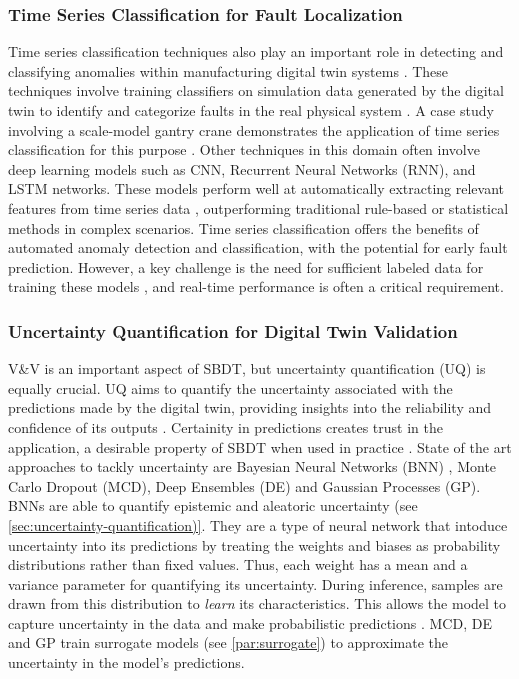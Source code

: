 \subsubsection*{Time Series Classification for Fault Localization}
Time series classification techniques also play an important role in detecting and classifying anomalies within manufacturing digital twin systems \autocite{Lugaresi2023compind}. These techniques involve training classifiers on simulation data generated by the digital twin to identify and categorize faults in the real physical system \autocite{dihan2024digital}. A case study involving a scale-model gantry crane demonstrates the application of time series classification for this purpose \autocite{mertens2024localizing}.
Other techniques in this domain often involve deep learning models such as CNN, Recurrent Neural Networks (RNN), and LSTM networks. These models perform well at automatically extracting relevant features from time series data \autocite{cao2023real}, outperforming traditional rule-based or statistical methods in complex scenarios. Time series classification offers the benefits of automated anomaly detection and classification, with the potential for early fault prediction. However, a key challenge is the need for sufficient labeled data for training these models \autocite{zemskov2024security}, and real-time performance is often a critical requirement.

\subsubsection*{Uncertainty Quantification for Digital Twin Validation}
\label{sec:uq-dt}
V&V is an important aspect of SBDT, but uncertainty quantification (UQ) is equally crucial. UQ aims to quantify the uncertainty associated with the predictions made by the digital twin, providing insights into the reliability and confidence of its outputs \autocite{sel2025survey}. Certainity in predictions creates trust in the application, a desirable property of SBDT when used in practice \autocite{dwivedi2023explainable}. State of the art approaches to tackly uncertainty are Bayesian Neural Networks (BNN) \autocite{li2017dynamic}, Monte Carlo Dropout (MCD), Deep Ensembles (DE) and Gaussian Processes (GP). BNNs are able to quantify epistemic and aleatoric uncertainty (see \autoref{sec:uncertainty-quantification)}. They are a type of neural network that intoduce uncertainty into its predictions by treating the weights and biases as probability distributions rather than fixed values. Thus, each weight has a mean and a variance parameter for quantifying its uncertainty. During inference, samples are drawn from this distribution to \textit{learn} its characteristics. This allows the model to capture uncertainty in the data and make probabilistic predictions \autocite{li2017dynamic}. MCD, DE and GP train surrogate models (see \autoref{par:surrogate}) to approximate the uncertainty in the model's predictions.

